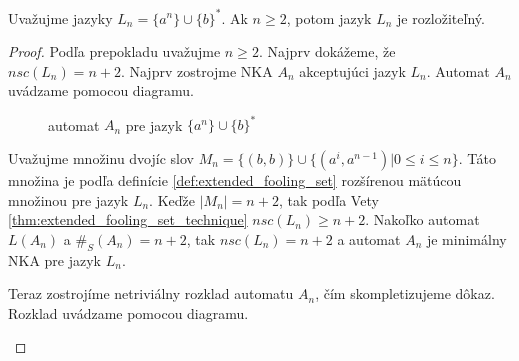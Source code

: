 \begin{proposition}
\label{thm:a^nub^*}
Uvažujme jazyky $ L_n = \lbrace a^{n} \rbrace \cup \lbrace b \rbrace^{*} $. Ak $ n \geq 2 $, potom jazyk $ L_n $ je rozložiteľný.
\end{proposition}

\begin{proof}
Podľa prepokladu uvažujme $ n \geq 2 $. Najprv dokážeme, že $ nsc(L_n) = n+2$. Najprv zostrojme NKA $ A_n $ akceptujúci jazyk $ L_n $. Automat $ A_n $ uvádzame pomocou diagramu.

\begin{figure}[H]
\centering
{}
\caption{automat $ A_n $ pre jazyk $ \lbrace a^{n} \rbrace \cup \lbrace b \rbrace^{*} $}
\label{fig:a^nub^*}
\end{figure}

Uvažujme množinu dvojíc slov $ M_n = \lbrace (b,b) \rbrace \cup \lbrace (a^i, a^{n-1}) | 0 \leq i \leq n \rbrace $. Táto množina je podľa definície \ref{def:extended_fooling_set} rozšírenou mätúcou množinou pre jazyk $ L_n $. Keďže $ |M_n| = n+2 $, tak podľa Vety \ref{thm:extended_fooling_set_technique} $ nsc(L_n) \geq n+2$. Nakoľko automat $ L(A_n) $ a $ \#_{S}(A_n) = n+2 $, tak $ nsc(L_n) = n+2$ a automat $ A_n $ je minimálny NKA pre jazyk $ L_n $.
\par
Teraz zostrojíme netriviálny rozklad automatu $ A_n $, čím skompletizujeme dôkaz. Rozklad uvádzame pomocou diagramu.

\begin{figure}[H]
\centering
{}
\end{figure}
\end{proof}
